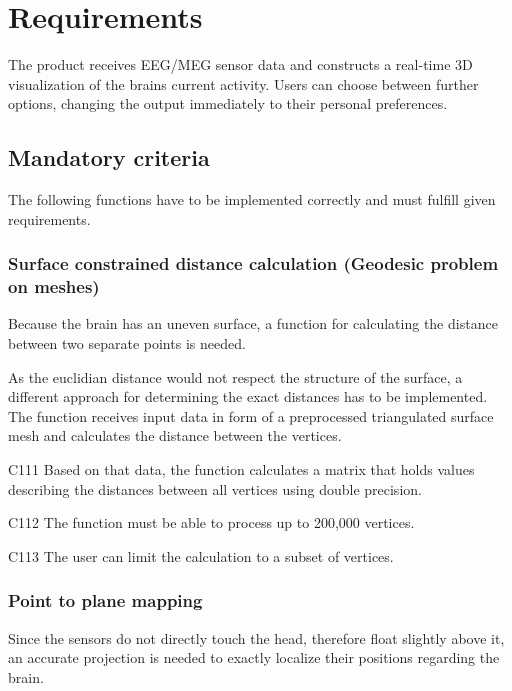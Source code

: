 \section{Requirements} 

	The product receives EEG/MEG sensor data and constructs a real-time 3D visualization of the brains current activity.
	Users can choose between further options, changing the output immediately to their personal preferences. 

\subsection{Mandatory criteria}

	The following functions have to be implemented correctly and must fulfill given requirements.
		
\subsubsection{Surface constrained distance calculation (Geodesic problem on meshes)} \label{scdc}
	Because the brain has an uneven surface, a function for calculating the distance between two separate points is needed.
	
	As the euclidian distance would not respect the structure of the surface, a different approach for determining the exact 	distances has to be implemented.  
	The function receives input data in form of a preprocessed triangulated surface mesh and calculates the distance between 	the vertices.			

	\begin{aims}
	
		\item[C111] Based on that data, the function calculates a matrix that holds values describing the distances between 						all vertices using double precision. 
		\item[C112] The function must be able to process up to 200,000 vertices.
		\item[C113] The user can limit the calculation to a subset of vertices.
	
	\end{aims}

\subsubsection{Point to plane mapping}

	Since the sensors do not directly touch the head, therefore float slightly above it, an accurate projection is needed to 
	exactly localize their positions regarding the brain. 
	

